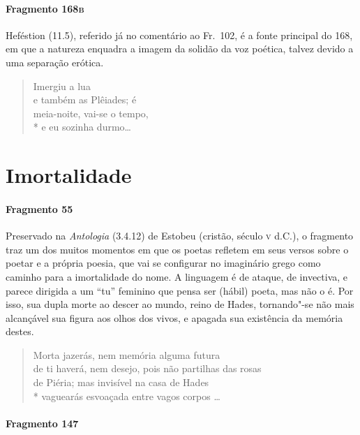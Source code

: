 \paragraph{Fragmento 168\textsc{b}}

{\small Heféstion (11.5), referido já no comentário ao Fr.~102, é a fonte principal do 168, em que a natureza enquadra a imagem da solidão da voz poética, talvez devido
a uma separação erótica.}

\begin{verse}
Imergiu a lua\\
e também as Plêiades; é\\
meia-noite, vai-se o tempo,\\*
e eu sozinha durmo\ldots{}
\end{verse}

\section{Imortalidade}

\paragraph{Fragmento 55}

{\small Preservado na \textit{Antologia} (3.4.12) de Estobeu (cristão, século \textsc{v} d.C.), o fragmento traz um dos muitos momentos em que os poetas refletem em seus versos
sobre o poetar e a própria poesia, que vai se configurar no imaginário grego
como caminho para a imortalidade do nome. A linguagem é de ataque, de
invectiva, e parece dirigida a um “tu” feminino que pensa ser (hábil) poeta, mas
não o é. Por isso, sua dupla morte ao descer ao mundo, reino de
Hades, tornando"-se não mais alcançável sua figura aos olhos dos vivos, e
apagada sua existência da memória destes.}

\begin{verse}
Morta jazerás, nem memória alguma futura\\
de ti haverá, nem desejo, pois não partilhas das rosas\\
de Piéria; mas invisível na casa de Hades\\*
vaguearás esvoaçada entre vagos corpos \ldots{}
\end{verse}

\paragraph{Fragmento 147}

